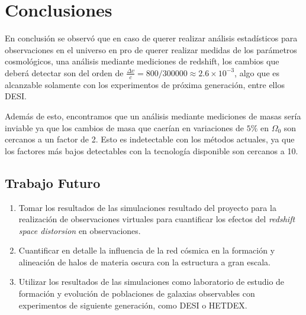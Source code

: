 \chapter{Conclusiones}
En conclusión se observó que en caso de querer realizar análisis estadísticos para observaciones en el universo en pro de querer realizar medidas de los parámetros cosmológicos, una análisis mediante mediciones de redshift, los cambios que deberá detectar son del orden de $\frac{\Delta v}{c}=800/300000\approx 2.6\times10^{-3}$, algo que es alcanzable solamente con los experimentos de próxima generación, entre ellos DESI. 


Además de esto, encontramos que un análisis mediante mediciones de masas sería inviable ya que los cambios de masa que caerían en variaciones de $5\%$ en $\Omega_0$ son cercanos a un factor de 2. Esto es indetectable con los métodos actuales, ya que los factores más bajos detectables con la tecnología disponible son cercanos a 10.


\section{Trabajo Futuro}
\begin{enumerate}
	\item Tomar los resultados de las simulaciones resultado del proyecto para la realización de observaciones virtuales para cuantificar los efectos del \textit{redshift space distorsion} en observaciones.
	\item Cuantificar en detalle la influencia de la red cósmica en la formación y alineación de halos de materia oscura con la estructura a gran escala.
	\item Utilizar los resultados de las simulaciones como laboratorio de estudio de formación y evolución de poblaciones de galaxias observables con experimentos de siguiente generación, como DESI o HETDEX.
\end{enumerate}